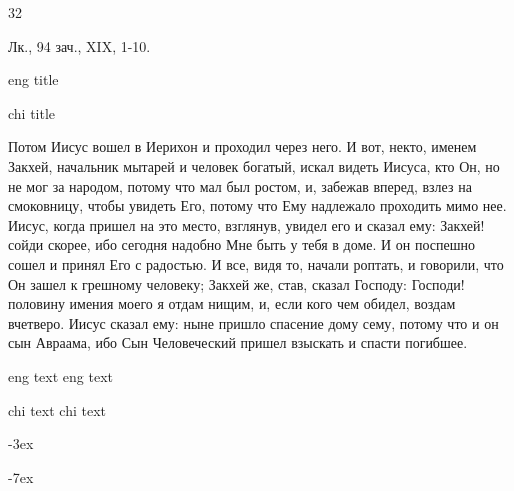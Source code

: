 32

\singlespacing %

\onehalfspacing %

\Large%

Лк., 94 зач., XIX, 1-10.

eng title

chi title

Потом Иисус вошел в Иерихон и проходил через него.
И вот, некто, именем Закхей, начальник мытарей и человек богатый,
искал видеть Иисуса, кто Он, но не мог за народом, потому что мал был ростом,
и, забежав вперед, взлез на смоковницу, чтобы увидеть Его, потому что Ему надлежало проходить мимо нее.
Иисус, когда пришел на это место, взглянув, увидел его и сказал ему: Закхей! сойди скорее, ибо сегодня надобно Мне быть у тебя в доме.
И он поспешно сошел и принял Его с радостью.
И все, видя то, начали роптать, и говорили, что Он зашел к грешному человеку;
Закхей же, став, сказал Господу: Господи! половину имения моего я отдам нищим, и, если кого чем обидел, воздам вчетверо.
Иисус сказал ему: ныне пришло спасение дому сему, потому что и он сын Авраама,
ибо Сын Человеческий пришел взыскать и спасти погибшее. 

eng text
eng text

chi text
chi text

\Huge%

-3ex%

-7ex%
